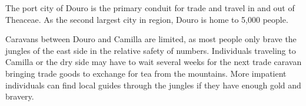 The port city of Douro is the primary conduit for trade and travel in and out of Theaceae.
As the second largest city in region, Douro is home to 5,000 people.

Caravans between Douro and Camilla are limited, as most people only brave the jungles of the east side in the relative safety of numbers.
Individuals traveling to Camilla or the dry side may have to wait several weeks for the next trade caravan bringing trade goods to exchange for tea from the mountains.
More impatient individuals can find local guides through the jungles if they have enough gold and bravery.
